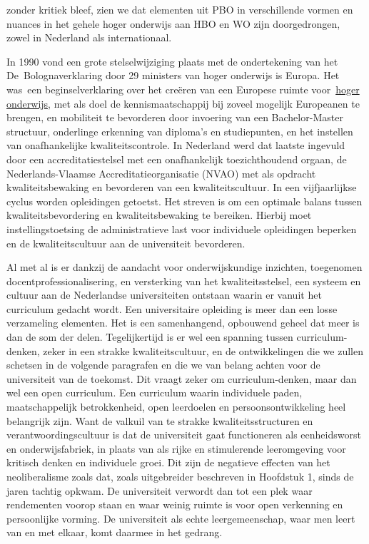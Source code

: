 \documentclass[empirical, authordate, ]{new-jote-article}
\begin{document}
zonder kritiek bleef, zien we dat elementen uit PBO in verschillende vormen en nuances in het gehele hoger onderwijs aan HBO en WO zijn doorgedrongen, zowel in Nederland als internationaal.



	In 1990 vond een grote stelselwijziging plaats met de ondertekening van het De Bolognaverklaring door 29 ministers van hoger onderwijs is Europa. Het was een beginselverklaring over het creëren van een Europese ruimte voor \href{https://nl.wikipedia.org/wiki/Hoger_onderwijs}{hoger onderwijs}, met als doel de kennismaatschappij bij zoveel mogelijk Europeanen te brengen, en mobiliteit te bevorderen door invoering van een Bachelor-Master structuur, onderlinge erkenning van diploma's en studiepunten, en het instellen van onafhankelijke kwaliteitscontrole. In Nederland werd dat laatste ingevuld door een accreditatiestelsel met een onafhankelijk toezichthoudend orgaan, de Nederlands-Vlaamse Accreditatieorganisatie (NVAO) met als opdracht kwaliteitsbewaking en bevorderen van een kwaliteitscultuur. In een vijfjaarlijkse cyclus worden opleidingen getoetst. Het streven is om een optimale balans tussen kwaliteitsbevordering en kwaliteitsbewaking te bereiken. Hierbij moet instellingstoetsing de administratieve last voor individuele opleidingen beperken en de kwaliteitscultuur aan de universiteit bevorderen.



	Al met al is er dankzij de aandacht voor onderwijskundige inzichten, toegenomen docentprofessionalisering, en versterking van het kwaliteitsstelsel, een systeem en cultuur aan de Nederlandse universiteiten ontstaan waarin er vanuit het curriculum gedacht wordt. Een universitaire opleiding is meer dan een losse verzameling elementen. Het is een samenhangend, opbouwend geheel dat meer is dan de som der delen. Tegelijkertijd is er wel een spanning tussen curriculum-denken, zeker in een strakke kwaliteitscultuur, en de ontwikkelingen die we zullen schetsen in de volgende paragrafen en die we van belang achten voor de universiteit van de toekomst. Dit vraagt zeker om curriculum-denken, maar dan wel een open curriculum. Een curriculum waarin individuele paden, maatschappelijk betrokkenheid, open leerdoelen en persoonsontwikkeling heel belangrijk zijn. Want de valkuil van te strakke kwaliteitsstructuren en verantwoordingscultuur is dat de universiteit gaat functioneren als eenheidsworst en onderwijsfabriek, in plaats van als rijke en stimulerende leeromgeving voor kritisch denken en individuele groei. Dit zijn de negatieve effecten van het neoliberalisme zoals dat, zoals uitgebreider beschreven in Hoofdstuk 1, sinds de jaren tachtig opkwam. De universiteit verwordt dan tot een plek waar rendementen voorop staan en waar weinig ruimte is voor open verkenning en persoonlijke vorming. De universiteit als echte leergemeenschap, waar men leert van en met elkaar, komt daarmee in het gedrang.
\end{document}
